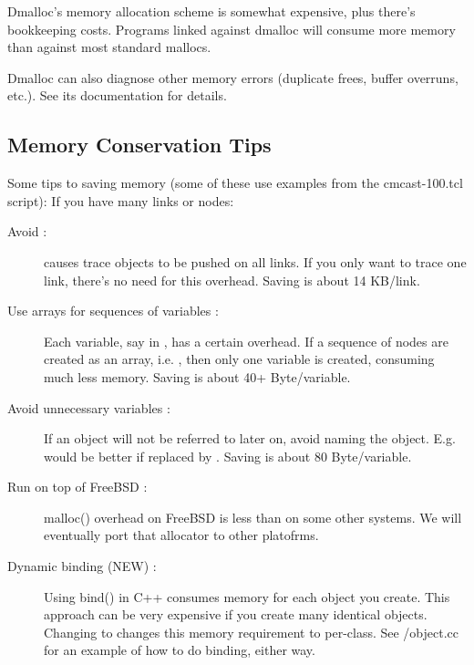 Dmalloc's memory allocation scheme is somewhat expensive, plus there's
bookkeeping costs. Programs linked against dmalloc will consume more
memory than against most standard mallocs. 

Dmalloc can also diagnose other memory errors (duplicate frees, buffer
overruns, etc.). See its documentation for details. 


\subsection{Memory Conservation Tips}
\label{sec:memconserve}

Some tips to saving memory (some of these use examples from the 
cmcast-100.tcl script): 
If you have many links or nodes: 
\begin{description}
\item[Avoid  :]
 causes trace objects to be pushed on all links. If 
you only want to trace one link, there's no need for this overhead. Saving
is about 14 KB/link. 

\item[Use arrays for sequences of variables :]
Each variable, say  in , has a certain
overhead. If a sequence of nodes are created as an array, i.e.
, then only one variable is created, consuming much less
memory. Saving is about 40+ Byte/variable. 

\item[Avoid unnecessary variables :]
If an object will not be referred to later on, avoid naming the object.
E.g.  would be better if replaced by . Saving is about 80 Byte/variable. 

\item[Run on top of FreeBSD :]
malloc() overhead on FreeBSD is less than on some other systems. We will
eventually port that allocator to other platofrms. 

\item[Dynamic binding (NEW) :]
Using bind() in C++ consumes memory for each object you create. This
approach can be very expensive if you create many identical objects.
Changing  to  changes this memory
requirement to per-class. See \ns/object.cc for an example of how to do
binding, either way.
 
\end{description}


